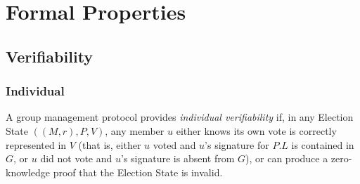 \section{Formal Properties}
%
  \subsection{Verifiability}
    \subsubsection{Individual}
    A group management protocol provides \emph{individual verifiability} if, in
    any Election State $((M,r), P, V)$, any member $u$
    either knows its own vote is correctly represented in $V$ (that is, either
    $u$ voted and $u$'s
    signature for $P.L$ is contained in $G$,
    or $u$ did not vote and $u$'s signature is absent from $G$), or can produce
    a zero-knowledge proof that the Election State is invalid.


